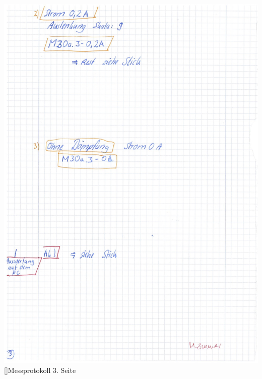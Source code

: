 \documentclass[12pt,a4paper,]{scrreprt}
\begin{document}
\begin{center}
    	\includegraphics[scale=0.33]{3.jpg}
    	[]{Messprotokoll 3. Seite}
    	\pagebreak

\end{center}
\end{document}
